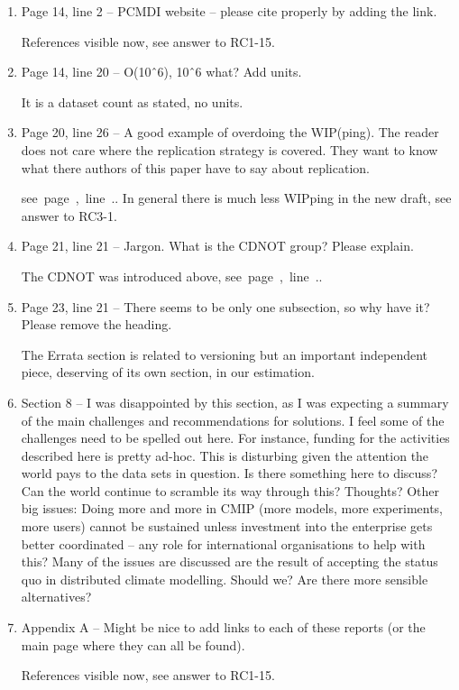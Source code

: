 \documentclass[gmd,manuscript]{copernicus}
\newcommand{\plref}[1]{\mbox{see page \pageref{p-#1}, line
    \lineref{l-#1}.}}
\newenvironment{answer}{\color{blue}}{}
\begin{document}
\begin{enumerate}[label=RC3-\arabic*,leftmargin=*]
  \begin{answer}
    \plref{RC3-18}
  \end{answer}
\item Page 14, line 2 -- PCMDI website -- please cite properly by adding
  the link.

  \begin{answer}
    References visible now, see answer to RC1-15.
  \end{answer}
\item Page 14, line 20 -- O(10ˆ6), 10ˆ6 what? Add units.

  \begin{answer}
    It is a dataset count as stated, no units.
  \end{answer}
\item Page 20, line 26 -- A good example of overdoing the WIP(ping).
  The reader does not care where the replication strategy is covered.
  They want to know what there authors of this paper have to say about
  replication.

  \begin{answer}
    \plref{RC3-21}. In general there is much less WIPping in the new
    draft, see answer to RC3-1.
  \end{answer}
\item Page 21, line 21 -- Jargon. What is the CDNOT group? Please
  explain.

  \begin{answer}
    The CDNOT was introduced above, \plref{RC3-22}.
  \end{answer}
\item Page 23, line 21 -- There seems to be only one subsection, so why
  have it? Please remove the heading.

  \begin{answer}
    The Errata section is related to versioning but an important
    independent piece, deserving of its own section, in our
    estimation.
  \end{answer}
\item Section 8 -- I was disappointed by this section, as I was
  expecting a summary of the main challenges and recommendations for
  solutions. I feel some of the challenges need to be spelled out
  here. For instance, funding for the activities described here is
  pretty ad-hoc. This is disturbing given the attention the world pays
  to the data sets in question. Is there something here to discuss?
  Can the world continue to scramble its way through this? Thoughts?
  Other big issues: Doing more and more in CMIP (more models, more
  experiments, more users) cannot be sustained unless investment into
  the enterprise gets better coordinated -- any role for international
  organisations to help with this? Many of the issues are discussed
  are the result of accepting the status quo in distributed climate
  modelling. Should we? Are there more sensible alternatives?
\item Appendix A -- Might be nice to add links to each of these
  reports (or the main page where they can all be found).

  \begin{answer}
    References visible now, see answer to RC1-15.
  \end{answer}
\end{enumerate}
\end{document}
